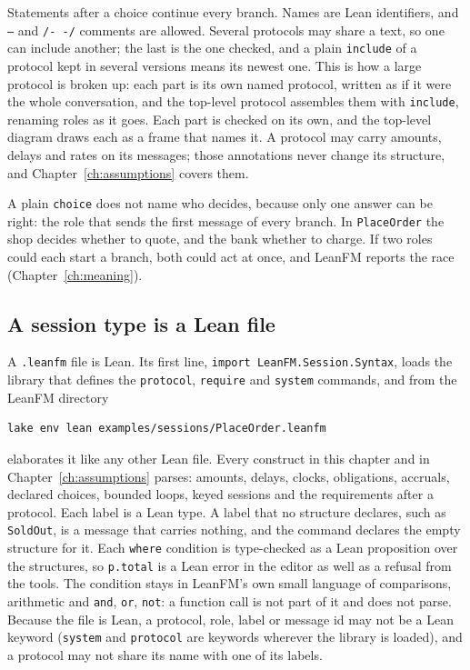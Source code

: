 Statements after a choice continue every branch. Names are Lean identifiers, and
\texttt{--} and \texttt{/- -/} comments are allowed. Several protocols may share a
text, so one can include another; the last is the one checked, and a plain
\texttt{include} of a protocol kept in several versions means its newest one. This is how a large
protocol is broken up: each part is its own named protocol, written as if it were
the whole conversation, and the top-level protocol assembles them with
\texttt{include}, renaming roles as it goes. Each part is checked on its own, and the
top-level diagram draws each as a frame that names it. A protocol may
carry amounts, delays and rates on its messages; those annotations never change
its structure, and Chapter~\ref{ch:assumptions} covers them.

A plain \texttt{choice} does not name who decides, because only one answer can
be right: the role that sends the first message of every branch. In
\texttt{PlaceOrder} the shop decides whether to quote, and the bank whether to
charge. If two roles could each start a branch, both could act at once, and
LeanFM reports the race (Chapter~\ref{ch:meaning}).

\subsection*{A session type is a Lean file}

A \texttt{.leanfm} file is Lean. Its first line, \texttt{import
LeanFM.Session.Syntax}, loads the library that defines the \texttt{protocol},
\texttt{require} and \texttt{system} commands, and from the LeanFM directory

\begin{lstlisting}[language={},basicstyle=\ttfamily\small]
lake env lean examples/sessions/PlaceOrder.leanfm
\end{lstlisting}

\noindent elaborates it like any other Lean file. Every construct in this chapter
and in Chapter~\ref{ch:assumptions} parses: amounts, delays, clocks, obligations,
accruals, declared choices, bounded loops, keyed sessions and the requirements
after a protocol. Each label is a Lean type. A label that no structure declares,
such as \texttt{SoldOut}, is a message that carries nothing, and the command
declares the empty structure for it. Each \texttt{where} condition is
type-checked as a Lean proposition over the structures, so \texttt{p.total} is a
Lean error in the editor as well as a refusal from the tools. The condition stays
in LeanFM's own small language of comparisons, arithmetic and \texttt{and},
\texttt{or}, \texttt{not}: a function call is not part of it and does not parse.
Because the file is Lean, a protocol, role, label or message id may not be a
Lean keyword (\texttt{system} and \texttt{protocol} are keywords wherever the
library is loaded), and a protocol may not share its name with one of its labels.


